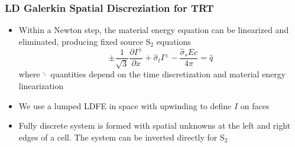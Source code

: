\documentclass[xcolor=dvipsnames,fontsize=8pt]{beamer}
\newcommand{\colb}[1]{{\color{blue} #1}}
\newlength{\wideitemsep}
\let\olditem\item
\renewcommand{\item}{\setlength{\itemsep}{\wideitemsep}\olditem}
\newcommand{\pderiv}[2]{\frac{\partial #1}{\partial #2}}
\begin{document}
\begin{frame}
    \frametitle{LD Galerkin Spatial Discreziation for TRT}
    \begin{itemize}
        \item Within a Newton step, the material energy equation can be
            \colb{linearized} and eliminated,
        producing fixed source S$_2$ equations
        \begin{equation}
            \pm\frac{1}{\sqrt{3}}
            \pderiv{I^\pm}{x} + {\hat\sigma_t} I^\pm  - \frac{\hat\sigma_sEc}{4\pi} =
            \hat q
        \end{equation}
        where $\hat{\cdot}$ quantities depend on the time discretization and material energy linearization
    \item We use a lumped LDFE in space with \colb{upwinding} to define $I$ on faces
    \begin{figure}
    \begin{centering}
    \end{centering}
    \end{figure}
    \item Fully discrete system is formed with spatial unknowns at the left and right edges of a cell. The system can be inverted directly for S$_2$
\end{itemize}
\end{frame}
\end{document}
